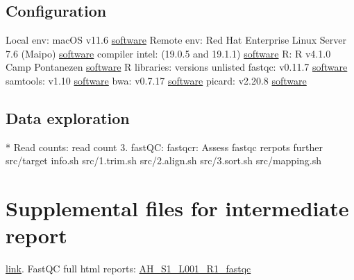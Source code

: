 \markdownRendererUlEndTight \markdownRendererInterblockSeparator
{}\subsection{Configuration}\markdownRendererInterblockSeparator
{}\markdownRendererUlBeginTight
\markdownRendererUlItem Local env: macOS v11.6 \href{https://support.apple.com/macos}{software}\markdownRendererUlItemEnd 
\markdownRendererUlItem Remote env: Red Hat Enterprise Linux Server 7.6 (Maipo) \href{https://www.redhat.com/en/technologies/linux-platforms/enterprise-linux}{software}\markdownRendererUlItemEnd 
\markdownRendererUlItem compiler intel: (19.0.5 and 19.1.1) \href{https://www.intel.com/content/www/us/en/developer/tools/oneapi/commercial-base-hpc.html#gs.ppyt3x}{software}\markdownRendererUlItemEnd 
\markdownRendererUlItem R: R v4.1.0 Camp Pontanezen \href{https://www.r-project.org}{software}\markdownRendererUlItemEnd 
\markdownRendererUlItem R libraries: versions unlisted\markdownRendererUlItemEnd 
\markdownRendererUlItem fastqc: v0.11.7 \href{https://www.bioinformatics.babraham.ac.uk/projects/fastqc/}{software}\markdownRendererUlItemEnd 
\markdownRendererUlItem samtools: v1.10 \href{https://www.htslib.org}{software}\markdownRendererUlItemEnd 
\markdownRendererUlItem bwa: v0.7.17 \href{https://janis.readthedocs.io/en/latest/tools/bioinformatics/bwa/bwamem.html}{software}\markdownRendererUlItemEnd 
\markdownRendererUlItem picard: v2.20.8 \href{http://broadinstitute.github.io/picard/}{software}\markdownRendererUlItemEnd 
\markdownRendererUlEndTight \markdownRendererInterblockSeparator
{}\subsection{Data exploration} * Read counts:\markdownRendererInterblockSeparator
{}read count 3. fastQC:\markdownRendererInterblockSeparator
{}\markdownRendererOlBeginTight
{}fastqcr: Assess fastqc rerpots further\markdownRendererOlItemEnd 
{}src/target info.sh\markdownRendererOlItemEnd 
{}src/1.trim.sh\markdownRendererOlItemEnd 
{}src/2.align.sh\markdownRendererOlItemEnd 
{}src/3.sort.sh\markdownRendererOlItemEnd 
{}src/mapping.sh\markdownRendererOlItemEnd 
\markdownRendererOlEndTight \markdownRendererInterblockSeparator
{}\section{Supplemental files for intermediate report} \href{https://github.com/DylanLawless/kit_assess/data/processed/}{link}.\markdownRendererInterblockSeparator
{}FastQC full html reports:\markdownRendererInterblockSeparator
{}\href{https://lawlessgenomics.com/pages/sophia/AH\markdownRendererEmphasis{S1}L001\markdownRendererEmphasis{R1}fastqc.html}{AH_S1_L001_R1_fastqc}\relax